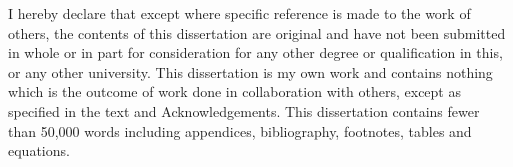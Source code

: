 
\begin{declaration}

I hereby declare that except where specific reference is made to the work of 
others, the contents of this dissertation are original and have not been 
submitted in whole or in part for consideration for any other degree or 
qualification in this, or any other university. This dissertation is my own 
work and contains nothing which is the outcome of work done in collaboration 
with others, except as specified in the text and Acknowledgements. This 
dissertation contains fewer than 50,000 words including appendices, 
bibliography, footnotes, tables and equations.


\end{declaration}

